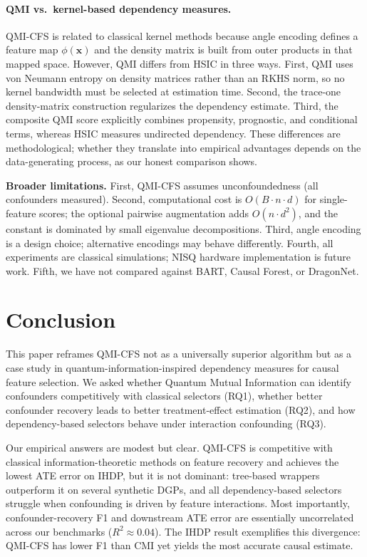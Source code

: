 \documentclass{svproc}
\begin{document}
\paragraph{QMI vs.\ kernel-based dependency measures.} QMI-CFS is related to classical kernel methods because angle encoding defines a feature map $\phi(\mathbf{x})$ and the density matrix is built from outer products in that mapped space. However, QMI differs from HSIC in three ways. First, QMI uses von Neumann entropy on density matrices rather than an RKHS norm, so no kernel bandwidth must be selected at estimation time. Second, the trace-one density-matrix construction regularizes the dependency estimate. Third, the composite QMI score explicitly combines propensity, prognostic, and conditional terms, whereas HSIC measures undirected dependency. These differences are methodological; whether they translate into empirical advantages depends on the data-generating process, as our honest comparison shows.

\textbf{Broader limitations.} First, QMI-CFS assumes unconfoundedness (all confounders measured). Second, computational cost is $O(B \cdot n \cdot d)$ for single-feature scores; the optional pairwise augmentation adds $O(n \cdot d^2)$, and the constant is dominated by small eigenvalue decompositions. Third, angle encoding is a design choice; alternative encodings may behave differently. Fourth, all experiments are classical simulations; NISQ hardware implementation is future work. Fifth, we have not compared against BART, Causal Forest, or DragonNet.

\section{Conclusion}
\label{sec:conclusion}

This paper reframes QMI-CFS not as a universally superior algorithm but as a case study in quantum-information-inspired dependency measures for causal feature selection. We asked whether Quantum Mutual Information can identify confounders competitively with classical selectors (RQ1), whether better confounder recovery leads to better treatment-effect estimation (RQ2), and how dependency-based selectors behave under interaction confounding (RQ3).

Our empirical answers are modest but clear. QMI-CFS is competitive with classical information-theoretic methods on feature recovery and achieves the lowest ATE error on IHDP, but it is not dominant: tree-based wrappers outperform it on several synthetic DGPs, and all dependency-based selectors struggle when confounding is driven by feature interactions. Most importantly, confounder-recovery F1 and downstream ATE error are essentially uncorrelated across our benchmarks ($R^2 \approx 0.04$). The IHDP result exemplifies this divergence: QMI-CFS has lower F1 than CMI yet yields the most accurate causal estimate.
\end{document}
